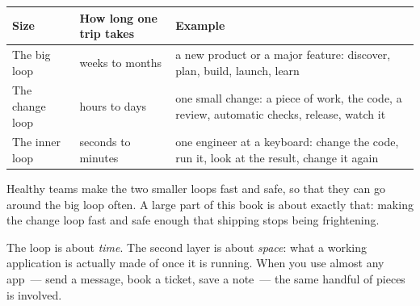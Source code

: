 
{\def\LTcaptype{none} %
\begin{longtable}[]{@{}
  >{\raggedright\arraybackslash}p{}
  >{\raggedright\arraybackslash}p{}
  >{\raggedright\arraybackslash}p{}@{}}
\toprule\noalign{}
\begin{minipage}[b]{\linewidth}\raggedright
Size
\end{minipage} & \begin{minipage}[b]{\linewidth}\raggedright
How long one trip takes
\end{minipage} & \begin{minipage}[b]{\linewidth}\raggedright
Example
\end{minipage} \\
\midrule\noalign{}
\endhead
\bottomrule\noalign{}
\endlastfoot
The big loop & weeks to months & a new product or a major feature: discover, plan, build, launch, learn \\
The change loop & hours to days & one small change: a piece of work, the code, a review, automatic checks, release, watch it \\
The inner loop & seconds to minutes & one engineer at a keyboard: change the code, run it, look at the result, change it again \\
\end{longtable}
}

Healthy teams make the two smaller loops fast and safe, so that they can go around the big loop often. A large part of this book is about exactly that: making the change loop fast and safe enough that shipping stops being frightening.

\label{how-software-gets-built:layer-2-the-pieces}

The loop is about \emph{time}. The second layer is about \emph{space}: what a working application is actually made of once it is running. When you use almost any app~--- send a message, book a ticket, save a note~--- the same handful of pieces is involved.

